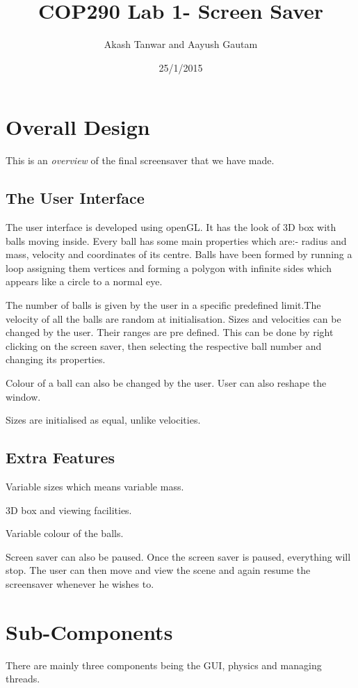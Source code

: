 \documentclass{article}
\title{COP290 Lab 1- Screen Saver}
\date{25/1/2015}
\author{Akash Tanwar and Aayush Gautam}
\begin{document}
	\maketitle
	\newpage
	\section{Overall Design}
	This is an \emph{overview} of the final screensaver that we have made.
	\subsection{The User Interface}
	The user interface is developed using openGL\@. It has the look of 3D box with balls moving inside. Every ball has some main properties which are:- radius and mass, velocity and coordinates of its centre. Balls have been formed by running a loop assigning them vertices and forming a polygon with infinite sides which appears like a circle to a normal eye.
	
	The number of balls is given by the user in a specific predefined limit.The velocity of all the balls are random at initialisation. Sizes and velocities can be changed by the user. Their ranges are pre defined. This can be done by right clicking on the screen saver, then selecting the respective ball number and changing its properties. 
		
	Colour of a ball can also be changed by the user. User can also reshape the window.

{\small*Sizes are initialised as equal, unlike velocities.}

	\subsection{Extra Features}
	Variable sizes which means variable mass.	
	
	3D box and viewing facilities.
	
	Variable colour of the balls.

	Screen saver can also be paused. Once the screen saver is paused, everything will stop. The user 	can then move and view the scene and again resume the screensaver whenever he wishes to.

	\section{Sub-Components}
	There are mainly three components being the GUI, physics and managing threads.
\end{document}
